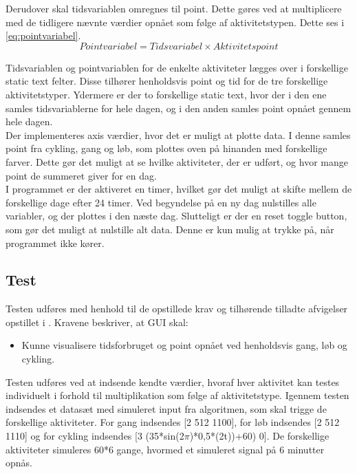 Derudover skal tidsvariablen omregnes til point. Dette gøres ved at multiplicere med de tidligere nævnte værdier opnået som følge af aktivitetstypen. Dette ses i \eqref{eq:pointvariabel}. 
\begin{equation}
Pointvariabel = Tidsvariabel \times Aktivitetspoint
\label{eq:pointvariabel}
\end{equation}

Tidsvariablen og pointvariablen for de enkelte aktiviteter lægges over i forskellige static text felter. Disse tilhører henholdsvis point og tid for de tre forskellige aktivitetstyper. Ydermere er der to forskellige static text, hvor der i den ene samles tidsvariablerne for hele dagen, og i den anden samles point opnået gennem hele dagen. \\
Der implementeres axis værdier, hvor det er muligt at plotte data. I denne samles point fra cykling, gang og løb, som plottes oven på hinanden med forskellige farver. Dette gør det muligt at se hvilke aktiviteter, der er udført, og hvor mange point de summeret giver for en dag. \\
I programmet er der aktiveret en timer, hvilket gør det muligt at skifte mellem de forskellige dage efter 24 timer. Ved begyndelse på en ny dag nulstilles alle variabler, og der plottes i den næste dag. Slutteligt er der en reset toggle button, som gør det muligt at nulstille alt data. Denne er kun mulig at trykke på, når programmet ikke kører. 

\subsection{Test}
Testen udføres med henhold til de opstillede krav og tilhørende tilladte afvigelser opstillet i . Kravene beskriver, at GUI skal:
\begin{itemize}
	\item Kunne visualisere tidsforbruget og point opnået ved henholdsvis gang, løb og cykling. 
\end{itemize}

Testen udføres ved at indsende kendte værdier, hvoraf hver aktivitet kan testes individuelt i forhold til multiplikation som følge af aktivitetstype.
Igennem testen indsendes et datasæt med simuleret input fra algoritmen, som skal trigge de forskellige aktiviteter. For gang indsendes [2 512 1100], for løb indsendes [2 512 1110] og for cykling indsendes [3 (35*sin(2$\pi$)*0,5*(2t))+60) 0]. De forskellige aktiviteter simuleres 60*6 gange, hvormed et simuleret signal på 6 minutter opnås.

